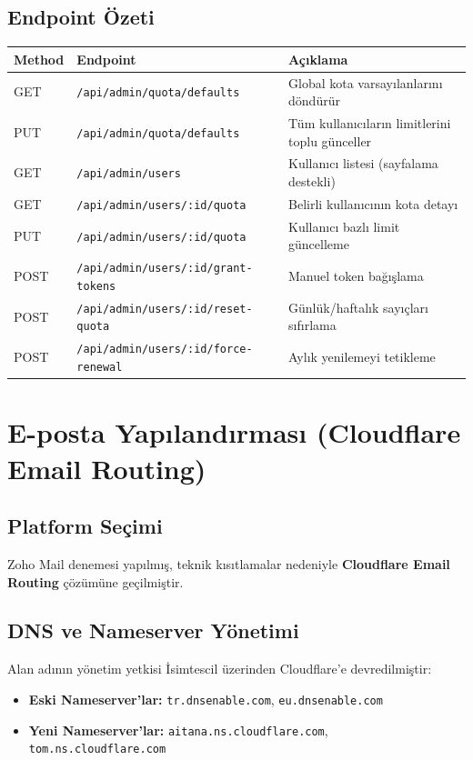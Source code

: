 \documentclass[12pt,a4paper]{article}
\begin{document}
\subsection{Endpoint \"{O}zeti}
\begin{center}
\begin{tabular}{|l|l|p{5.5cm}|}
\hline
\textbf{Method} & \textbf{Endpoint} & \textbf{A\c{c}{\i}klama} \\
\hline
GET  & \texttt{/api/admin/quota/defaults}         & Global kota varsay{\i}lanlar{\i}n{\i} d\"{o}nd\"{u}r\"{u}r \\
PUT  & \texttt{/api/admin/quota/defaults}         & T\"{u}m kullan{\i}c{\i}lar{\i}n limitlerini toplu g\"{u}nceller \\
GET  & \texttt{/api/admin/users}                  & Kullan{\i}c{\i} listesi (sayfalama destekli) \\
GET  & \texttt{/api/admin/users/:id/quota}        & Belirli kullan{\i}c{\i}n{\i}n kota detay{\i} \\
PUT  & \texttt{/api/admin/users/:id/quota}        & Kullan{\i}c{\i} bazl{\i} limit g\"{u}ncelleme \\
POST & \texttt{/api/admin/users/:id/grant-tokens} & Manuel token ba\u{g}{\i}\c{s}lama \\
POST & \texttt{/api/admin/users/:id/reset-quota}  & G\"{u}nl\"{u}k/haftal{\i}k say{\i}\c{c}lar{\i} s{\i}f{\i}rlama \\
POST & \texttt{/api/admin/users/:id/force-renewal}& Ayl{\i}k yenilemeyi tetikleme \\
\hline
\end{tabular}
\end{center}

\section{E-posta Yap{\i}land{\i}rmas{\i} (Cloudflare Email Routing)}

\subsection{Platform Se\c{c}imi}
Zoho Mail denemesi yap{\i}lm{\i}\c{s}, teknik k{\i}s{\i}tlamalar nedeniyle \textbf{Cloudflare Email Routing}
\c{c}\"{o}z\"{u}m\"{u}ne ge\c{c}ilmi\c{s}tir.

\subsection{DNS ve Nameserver Y\"{o}netimi}
Alan ad{\i}n{\i}n y\"{o}netim yetkisi \.{I}simtescil \"{u}zerinden Cloudflare'e devredilmi\c{s}tir:
\begin{itemize}
  \item \textbf{Eski Nameserver'lar:} \texttt{tr.dnsenable.com}, \texttt{eu.dnsenable.com}
  \item \textbf{Yeni Nameserver'lar:} \texttt{aitana.ns.cloudflare.com}, \texttt{tom.ns.cloudflare.com}
\end{itemize}
\end{document}
